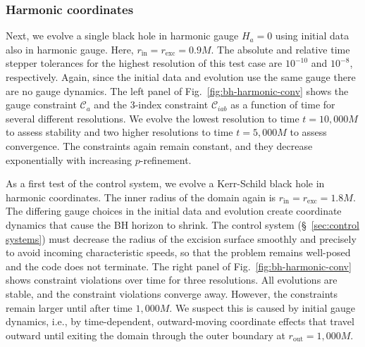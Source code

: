 \begin{bibunit}[unsrtnat]
\subsubsection{Harmonic coordinates\label{sec:harmonic single hole}}

Next, we evolve a single black hole in harmonic gauge $H_a=0$ using initial data
also in harmonic gauge. Here, $r_{\mathrm{in}}=r_{\mathrm{exc}}=0.9M$. The
absolute and relative time stepper tolerances for the highest resolution of this
test case are $10^{-10}$ and $10^{-8}$, respectively. Again,
since the initial data and evolution use the same gauge there are no gauge
dynamics. The left panel of Fig.~\ref{fig:bh-harmonic-conv} shows the gauge
constraint $\mathcal{C}_a$ and the 3-index constraint $\mathcal{C}_{iab}$ as a
function of time for several different resolutions. We evolve the lowest
resolution to time $t=10,000M$ to assess stability and two higher resolutions to
time $t=5,000M$ to assess convergence. The constraints again remain constant,
and they decrease exponentially with increasing $p$-refinement.

As a first test of the control system, we evolve a Kerr-Schild black hole in
harmonic coordinates. The inner radius of the domain again is
$r_{\mathrm{in}}=r_{\mathrm{exc}}=1.8M$. The differing gauge choices in the
initial data and evolution create coordinate dynamics that cause the BH horizon
to shrink. The control system (\S~\ref{sec:control systems}) must decrease the
radius of the excision surface smoothly and precisely to avoid incoming
characteristic speeds, so that the problem remains well-posed and the code does
not terminate. The right panel of Fig.~\ref{fig:bh-harmonic-conv} shows
constraint violations over time for three resolutions. All evolutions are
stable, and the constraint violations converge away. However, the constraints
remain larger until after time $1,000M$. We suspect this is caused by initial
gauge dynamics, i.e., by time-dependent, outward-moving coordinate effects that
travel outward until exiting the domain through the outer boundary at
$r_{\mathrm{out}}=1,000M$.


\end{bibunit}
